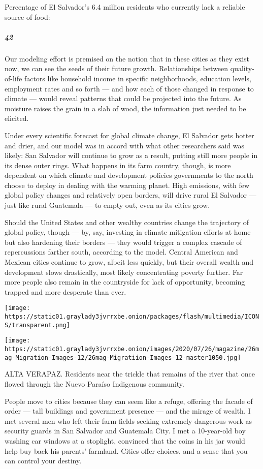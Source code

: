 Percentage of El Salvador's 6.4 million residents who currently lack a
reliable source of food:

\hypertarget{42}{%
\subparagraph{42}\label{42}}

Our modeling effort is premised on the notion that in these cities as
they exist now, we can see the seeds of their future growth.
Relationships between quality-of-life factors like household income in
specific neighborhoods, education levels, employment rates and so forth
--- and how each of those changed in response to climate --- would
reveal patterns that could be projected into the future. As moisture
raises the grain in a slab of wood, the information just needed to be
elicited.

Under every scientific forecast for global climate change, El Salvador
gets hotter and drier, and our model was in accord with what other
researchers said was likely: San Salvador will continue to grow as a
result, putting still more people in its dense outer rings. What happens
in its farm country, though, is more dependent on which climate and
development policies governments to the north choose to deploy in
dealing with the warming planet. High emissions, with few global policy
changes and relatively open borders, will drive rural El Salvador ---
just like rural Guatemala --- to empty out, even as its cities grow.

Should the United States and other wealthy countries change the
trajectory of global policy, though --- by, say, investing in climate
mitigation efforts at home but also hardening their borders --- they
would trigger a complex cascade of repercussions farther south,
according to the model. Central American and Mexican cities continue to
grow, albeit less quickly, but their overall wealth and development
slows drastically, most likely concentrating poverty further. Far more
people also remain in the countryside for lack of opportunity, becoming
trapped and more desperate than ever.

\texttt{[image: https://static01.graylady3jvrrxbe.onion/packages/flash/multimedia/ICONS/transparent.png]}

\texttt{[image: https://static01.graylady3jvrrxbe.onion/images/2020/07/26/magazine/26mag-Migration-Images-12/26mag-Migratiion-Images-12-master1050.jpg]}

ALTA VERAPAZ. Residents near the trickle that remains of the river that
once flowed through the Nuevo Paraíso Indigenous community.

People move to cities because they can seem like a refuge, offering the
facade of order --- tall buildings and government presence --- and the
mirage of wealth. I met several men who left their farm fields seeking
extremely dangerous work as security guards in San Salvador and
Guatemala City. I met a 10-year-old boy washing car windows at a
stoplight, convinced that the coins in his jar would help buy back his
parents' farmland. Cities offer choices, and a sense that you can
control your destiny.

